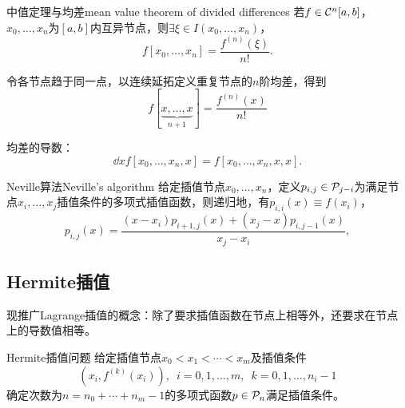 \begin{theorem}
    {中值定理与均差}{mean value theorem of divided differences}
    若$f \in \mathcal{C}^n[a,b]$，$x_0,\ldots,x_n$为$[a,b]$内互异节点，则$\exists\xi \in I(x_0,\ldots,x_n)$，
    \begin{equation}
        f[x_0,\ldots,x_n] = \frac{f^{(n)}(\xi)}{n!}.
    \end{equation}
\end{theorem}

\begin{corollary}
    令各节点趋于同一点，以连续延拓定义重复节点的$n$阶均差，得到
    \begin{equation}
        f[\underbrace{x,\ldots,x}_{n+1}] = \frac{f^{(n)}(x)}{n!}
    \end{equation}
\end{corollary}
\begin{corollary}
    均差的导数：
    \begin{equation}
        \dd xf[x_0,\ldots,x_n,x] = f[x_0,\ldots,x_n,x,x].
    \end{equation}
\end{corollary}

\begin{theorem}
    {Neville算法}{Neville's algorithm}
    给定插值节点$x_0,\ldots,x_n$，定义$p_{i,j} \in \mathcal{P}_{j-i}$为满足节点$x_i,\ldots,x_j$插值条件的多项式插值函数，则递归地，有$p_{i,i}(x) \equiv f(x_i)$，
    \begin{equation}
        \label{eqn:Neville}
        p_{i,j}(x) = \frac{(x - x_i)p_{i+1,j}(x) + (x_j - x)p_{i,j-1}(x)}{x_j - x_i},
    \end{equation}
\end{theorem}

\subsection{Hermite插值}

现推广Lagrange插值的概念：除了要求插值函数在节点上相等外，还要求在节点上的导数值相等。

\begin{definition}
    {Hermite插值问题}{}
    给定插值节点$x_0 < x_1 < \cdots < x_m$及插值条件
    \begin{equation}\label{eq:na-hermite-data}
        (x_i,f^{(k)}(x_i)),\enspace i = 0,1,\ldots,m,\enspace k = 0,1,\ldots,n_i - 1
    \end{equation}
    确定次数为$n = n_0 + \cdots + n_m - 1$的多项式函数$p \in \mathcal{P}_n$满足插值条件。
\end{definition}

